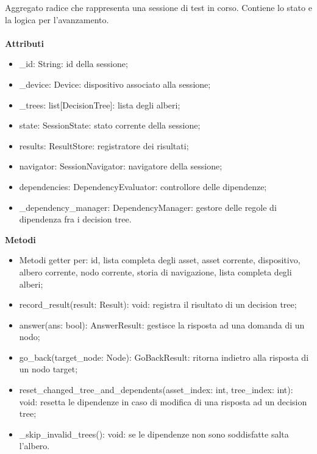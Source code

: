 \documentclass[a4paper,12pt]{article}
\begin{document}
                    Aggregato radice che rappresenta una sessione di test in corso. Contiene lo stato e la logica per l'avanzamento.\\\\
                    \textbf{Attributi}
                    \begin{itemize}
                        \item {\ttfamily \_id: String}: id della sessione;
                        \item {\ttfamily \_device: Device}: dispositivo associato alla sessione;
                        \item {\ttfamily \_trees: list[DecisionTree]}: lista degli alberi;
                        \item {\ttfamily state: SessionState}: stato corrente della sessione;
                        \item {\ttfamily results: ResultStore}: registratore dei risultati;
                        \item {\ttfamily navigator: SessionNavigator}: navigatore della sessione;
                        \item {\ttfamily dependencies: DependencyEvaluator}: controllore delle dipendenze;
                        \item {\ttfamily \_dependency\_manager: DependencyManager}: gestore delle regole di dipendenza fra i decision tree.
                    \end{itemize}
                    \textbf{Metodi}
                        \begin{itemize}
                            \item Metodi getter per: id, lista completa degli asset, asset corrente, dispositivo, albero corrente, nodo corrente, storia di navigazione, lista completa degli alberi;
                            \item {\ttfamily record\_result(result: Result): void}: registra il risultato di un decision tree;
                            \item {\ttfamily answer(ans: bool): AnswerResult}: gestisce la risposta ad una domanda di un nodo;
                            \item {\ttfamily go\_back(target\_node: Node): GoBackResult}: ritorna indietro alla risposta di un nodo target;
                            \item {\ttfamily reset\_changed\_tree\_and\_dependents(asset\_index: int,  tree\_index: int): void}: resetta le dipendenze in caso di modifica di una risposta ad un decision tree;
                            \item {\ttfamily \_skip\_invalid\_trees(): void}: se le dipendenze non sono soddisfatte salta l'albero.
                        \end{itemize}
\end{document}
